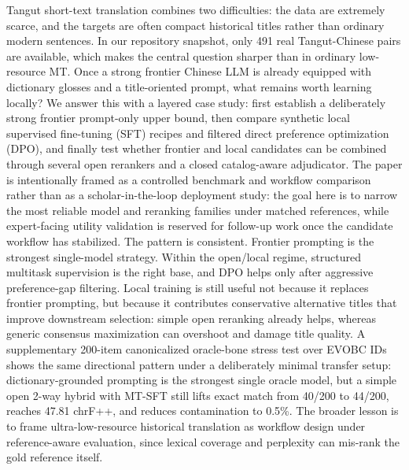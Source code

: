 Tangut short-text translation combines two difficulties: the data are extremely scarce, and the targets are often compact historical titles rather than ordinary modern sentences. In our repository snapshot, only 491 real Tangut-Chinese pairs are available, which makes the central question sharper than in ordinary low-resource MT. Once a strong frontier Chinese LLM is already equipped with dictionary glosses and a title-oriented prompt, what remains worth learning locally? We answer this with a layered case study: first establish a deliberately strong frontier prompt-only upper bound, then compare synthetic local supervised fine-tuning (SFT) recipes and filtered direct preference optimization (DPO), and finally test whether frontier and local candidates can be combined through several open rerankers and a closed catalog-aware adjudicator. The paper is intentionally framed as a controlled benchmark and workflow comparison rather than as a scholar-in-the-loop deployment study: the goal here is to narrow the most reliable model and reranking families under matched references, while expert-facing utility validation is reserved for follow-up work once the candidate workflow has stabilized. The pattern is consistent. Frontier prompting is the strongest single-model strategy. Within the open/local regime, structured multitask supervision is the right base, and DPO helps only after aggressive preference-gap filtering. Local training is still useful not because it replaces frontier prompting, but because it contributes conservative alternative titles that improve downstream selection: simple open reranking already helps, whereas generic consensus maximization can overshoot and damage title quality. A supplementary 200-item canonicalized oracle-bone stress test over EVOBC IDs shows the same directional pattern under a deliberately minimal transfer setup: dictionary-grounded prompting is the strongest single oracle model, but a simple open 2-way hybrid with MT-SFT still lifts exact match from 40/200 to 44/200, reaches 47.81 chrF++, and reduces contamination to 0.5\%. The broader lesson is to frame ultra-low-resource historical translation as workflow design under reference-aware evaluation, since lexical coverage and perplexity can mis-rank the gold reference itself.
